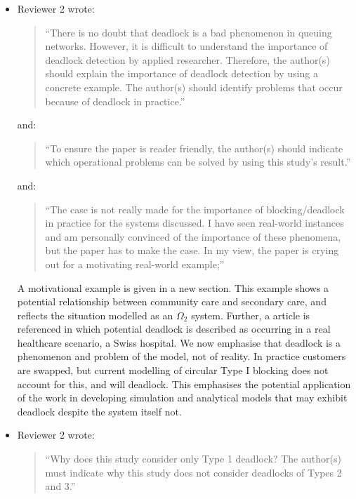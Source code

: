 \documentclass{article}
\begin{document}
\begin{itemize}

\item Reviewer 2 wrote:
\begin{quote}
``There is no doubt that deadlock is a bad phenomenon in queuing networks.
However, it is difficult to understand the importance of deadlock detection by
applied researcher.
Therefore, the author(s) should explain the importance of deadlock detection
by using a concrete example.
The author(s) should identify problems that occur because of deadlock in
practice.''
\end{quote}

and:

\begin{quote}
``To ensure the paper is reader friendly, the author(s) should indicate which
operational problems can be solved by using this study’s result.''
\end{quote}

and:

\begin{quote}
``The case is not really made for the importance of blocking/deadlock in
practice for the systems discussed.
I have seen real-world instances and am personally convinced of the importance
of these phenomena, but the paper has to make the case.
In my view, the paper is crying out for a motivating real-world example;''
\end{quote}

A motivational example is given in a new section.
This example shows a potential relationship between community care and
secondary care, and reflects the situation modelled as an $\Omega_2$ system.
Further, a article is referenced in which potential deadlock is described as
occurring in a real healthcare scenario, a Swiss hospital.
We now emphasise that deadlock is a phenomenon and problem of the model, not
of reality.
In practice customers are swapped, but current modelling of circular Type I
blocking does not account for this, and will deadlock.
This emphasises the potential application of the work in developing simulation
and analytical models that may exhibit deadlock despite the system itself not.


\item Reviewer 2 wrote:
\begin{quote}
``Why does this study consider only Type 1 deadlock?
The author(s) must indicate why this study does not consider deadlocks of
Types 2 and 3.''
\end{quote}


\end{itemize}
\end{document}
